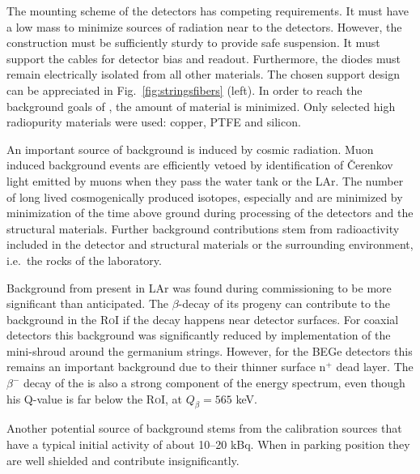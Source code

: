 The mounting scheme of the detectors has competing requirements. It must have a low mass to minimize sources of radiation near to the detectors. However, the construction must be sufficiently sturdy to provide safe suspension. It must support the cables for detector bias and readout. Furthermore, the diodes must remain electrically isolated from all other materials. The chosen support design can be appreciated in Fig.~\ref{fig:stringsfibers} (left). In order to reach the background goals of {\gerda}, the amount of material is minimized. Only selected high radiopurity materials were used: copper, PTFE and silicon.

 An important source of background is induced by cosmic radiation. Muon induced background events are efficiently vetoed by identification of Čerenkov light emitted by muons when they pass the water tank or the LAr. The number of long lived cosmogenically produced isotopes, especially  and  are minimized by minimization of the time above ground during processing of the detectors and the structural materials. Further background contributions stem from radioactivity included in the detector and structural materials or the surrounding environment, i.e.~the rocks of the laboratory.

Background from  present in LAr was found during {\gerda} commissioning to be more significant than anticipated. The $\beta$-decay of its progeny  can contribute to the background in the \textsc{RoI} if the decay happens near detector surfaces. For coaxial detectors this background was significantly reduced by implementation of the mini-shroud around the germanium strings. However, for the BEGe detectors this remains an important background due to their thinner surface n$^+$ dead layer. The $\beta^-$ decay of the  is also a strong component of the energy spectrum, even though his Q-value is far below the \textsc{RoI}, at $Q_\beta=565$ keV.

Another potential source of background stems from the calibration sources that have a typical initial activity of about 10–20 kBq. When in parking position they are well shielded and contribute insignificantly.

